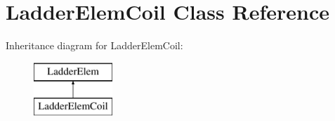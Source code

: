 \hypertarget{class_ladder_elem_coil}{\section{Ladder\-Elem\-Coil Class Reference}
\label{class_ladder_elem_coil}
}
Inheritance diagram for Ladder\-Elem\-Coil\-:\begin{figure}[H]
\begin{center}
\leavevmode
\includegraphics[height=2.000000cm]{class_ladder_elem_coil}
\end{center}
\end{figure}
